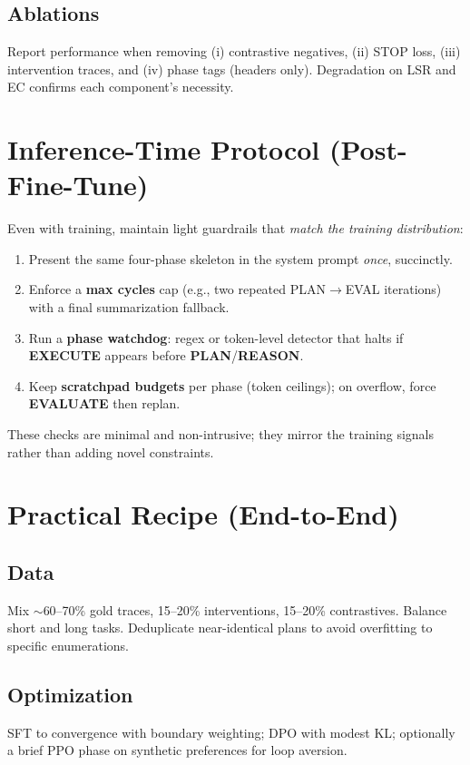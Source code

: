 \documentclass[11pt]{article}
\begin{document}
\subsection{Ablations}
Report performance when removing (i) contrastive negatives, (ii) STOP loss,
(iii) intervention traces, and (iv) phase tags (headers only). Degradation on LSR and EC
confirms each component's necessity.

\section{Inference-Time Protocol (Post-Fine-Tune)}
Even with training, maintain light guardrails that \emph{match the training distribution}:
\begin{enumerate}[leftmargin=2em]
  \item Present the same four-phase skeleton in the system prompt \emph{once}, succinctly.
  \item Enforce a \textbf{max cycles} cap (e.g., two repeated PLAN$\rightarrow$EVAL iterations) with a final summarization fallback.
  \item Run a \textbf{phase watchdog}: regex or token-level detector that halts if \textbf{EXECUTE} appears before \textbf{PLAN}/\textbf{REASON}.
  \item Keep \textbf{scratchpad budgets} per phase (token ceilings); on overflow, force \textbf{EVALUATE} then replan.
\end{enumerate}
These checks are minimal and non-intrusive; they mirror the training signals rather than adding novel constraints.

\section{Practical Recipe (End-to-End)}
\subsection*{Data}
Mix $\sim$60--70\% gold traces, 15--20\% interventions, 15--20\% contrastives. Balance short and long tasks. Deduplicate near-identical plans to avoid overfitting to specific enumerations.

\subsection*{Optimization}
SFT to convergence with boundary weighting; DPO with modest KL; optionally a brief PPO phase on synthetic preferences for loop aversion.
\end{document}
